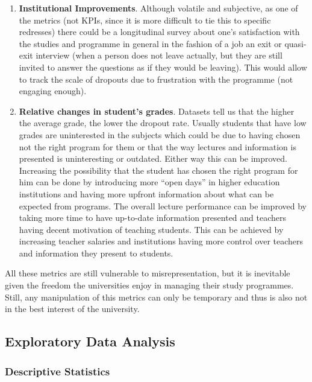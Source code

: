 \documentclass[
  letterpaper,
  DIV=11,
  numbers=noendperiod]{scrartcl}
\begin{document}
\begin{enumerate}
\def\labelenumi{\alph{enumi}.}
\item
  \textbf{Institutional Improvements}. Although volatile and subjective,
  as one of the metrics (not KPIs, since it is more difficult to tie
  this to specific redresses) there could be a longitudinal survey about
  one's satisfaction with the studies and programme in general in the
  fashion of a job an exit or quasi-exit interview (when a person does
  not leave actually, but they are still invited to answer the questions
  as if they would be leaving). This would allow to track the scale of
  dropouts due to frustration with the programme (not engaging enough).
\item
  \textbf{Relative changes in student's grades}. Datasets tell us that
  the higher the average grade, the lower the dropout rate. Usually
  students that have low grades are uninterested in the subjects which
  could be due to having chosen not the right program for them or that
  the way lectures and information is presented is uninteresting or
  outdated. Either way this can be improved. Increasing the possibility
  that the student has chosen the right program for him can be done by
  introducing more \enquote{open days} in higher education institutions
  and having more upfront information about what can be expected from
  programs. The overall lecture performance can be improved by taking
  more time to have up-to-date information presented and teachers having
  decent motivation of teaching students. This can be achieved by
  increasing teacher salaries and institutions having more control over
  teachers and information they present to students.
\end{enumerate}

All these metrics are still vulnerable to misrepresentation, but it is
inevitable given the freedom the universities enjoy in managing their
study programmes. Still, any manipulation of this metrics can only be
temporary and thus is also not in the best interest of the university.

\hypertarget{sec-eda}{%
\subsection{Exploratory Data Analysis}\label{sec-eda}}

\hypertarget{descriptive-statistics}{%
\subsubsection{Descriptive Statistics}\label{descriptive-statistics}}
\end{document}
